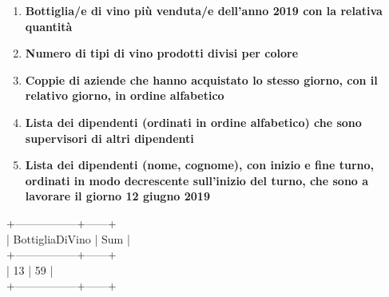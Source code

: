 \begin{enumerate}
	\item \textbf{Bottiglia/e di vino più venduta/e dell'anno 2019 con la relativa quantità}
	\item \textbf{Numero di tipi di vino prodotti divisi per colore}
	\item \textbf{Coppie di aziende che hanno acquistato lo stesso giorno, con il relativo giorno, in ordine alfabetico}
	\item \textbf{Lista dei dipendenti (ordinati in ordine alfabetico) che sono supervisori di altri dipendenti}
	\item \textbf{Lista dei dipendenti (nome, cognome), con inizio e fine turno, ordinati in modo decrescente sull'inizio del turno, che sono a lavorare il giorno 12 giugno 2019}
	
\end{enumerate}

	+-----------------+------+\\
	| BottigliaDiVino | Sum  |\\
	+-----------------+------+\\
	|              13 |   59 |\\
	+-----------------+------+\\